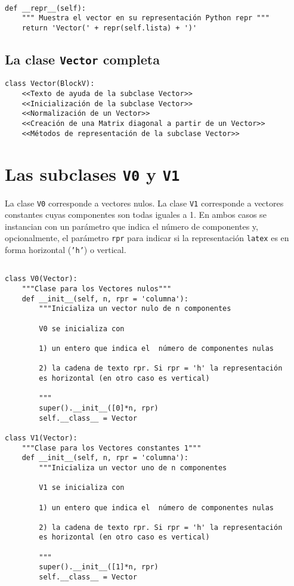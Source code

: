 \documentclass[11pt]{report}
\begin{document}
\begin{verbatim}

def __repr__(self):
    """ Muestra el vector en su representación Python repr """
    return 'Vector(' + repr(self.lista) + ')'

\end{verbatim}
\section{La clase \texttt{Vector} completa}
\label{sec:org5ba5a7a}

\begin{verbatim}
class Vector(BlockV):
    <<Texto de ayuda de la subclase Vector>>
    <<Inicialización de la subclase Vector>>
    <<Normalización de un Vector>>
    <<Creación de una Matrix diagonal a partir de un Vector>>
    <<Métodos de representación de la subclase Vector>>
\end{verbatim}


\chapter{Las subclases \texttt{V0} y \texttt{V1}}
\label{sec:orge154d98}

La clase \texttt{V0} corresponde a vectores nulos. La clase \texttt{V1} corresponde
a vectores constantes cuyas componentes son todas iguales a 1. En
ambos casos se instancian con un parámetro que indica el número de
componentes y, opcionalmente, el parámetro \texttt{rpr} para indicar si la
representación \texttt{latex} es en forma horizontal (\texttt{'h'}) o vertical.

\begin{verbatim}

class V0(Vector):
    """Clase para los Vectores nulos"""
    def __init__(self, n, rpr = 'columna'):
        """Inicializa un vector nulo de n componentes

        V0 se inicializa con

        1) un entero que indica el  número de componentes nulas
    
        2) la cadena de texto rpr. Si rpr = 'h' la representación
        es horizontal (en otro caso es vertical)

        """
        super().__init__([0]*n, rpr)
        self.__class__ = Vector

class V1(Vector):
    """Clase para los Vectores constantes 1"""
    def __init__(self, n, rpr = 'columna'):
        """Inicializa un vector uno de n componentes

        V1 se inicializa con

        1) un entero que indica el  número de componentes nulas
    
        2) la cadena de texto rpr. Si rpr = 'h' la representación
        es horizontal (en otro caso es vertical)

        """
        super().__init__([1]*n, rpr)
        self.__class__ = Vector

\end{verbatim}
\end{document}
